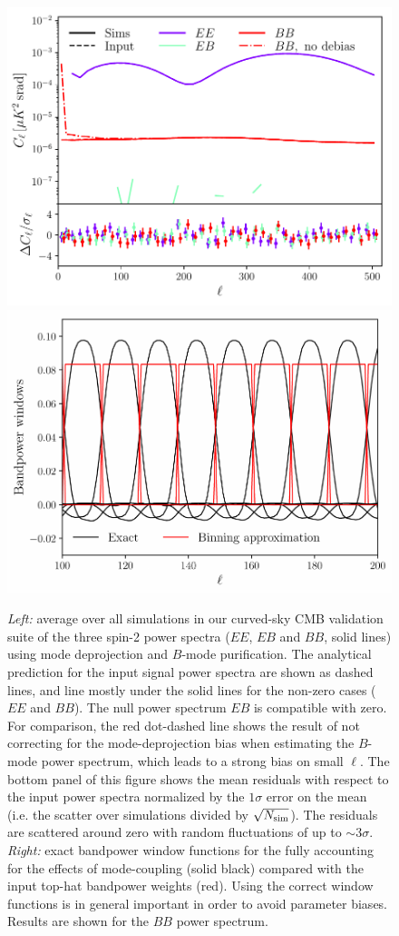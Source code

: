 \documentclass[usenatbib]{mnrasb}
\begin{document}
      \begin{figure}
        \centering
        \includegraphics[width=0.99\columnwidth]{val_cl_cmb_sph}
        \includegraphics[width=0.99\columnwidth]{val_cmb_bpw}
        \caption{{\sl Left:} average over all simulations in our curved-sky CMB validation suite of the three spin-2 power spectra ($EE$, $EB$ and $BB$, solid lines) using mode deprojection and $B$-mode purification. The analytical prediction for the input signal power spectra are shown as dashed lines, and line mostly under the solid lines for the non-zero cases ($EE$ and $BB$). The null power spectrum $EB$ is compatible with zero. For comparison, the red dot-dashed line shows the result of not correcting for the mode-deprojection bias when estimating the $B$-mode power spectrum, which leads to a strong bias on small $\ell$. The bottom panel of this figure shows the mean residuals with respect to the input power spectra normalized by the $1\sigma$ error on the mean (i.e. the scatter over simulations divided by $\sqrt{N_{\rm sim}}$). The residuals are scattered around zero with random fluctuations of up to $\sim3\sigma$. {\sl Right:} exact bandpower window functions for the fully accounting for the effects of mode-coupling (solid black) compared with the input top-hat bandpower weights (red). Using the correct window functions is in general important in order to avoid parameter biases. Results are shown for the $BB$ power spectrum.} \label{fig:cmb_val_cls}
      \end{figure}
\end{document}
